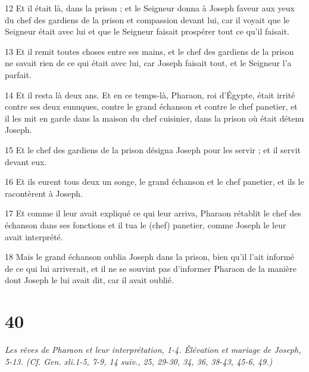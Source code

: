 \par 12 Et il était là, dans la prison ; et le Seigneur donna à Joseph faveur aux yeux du chef des gardiens de la prison et compassion devant lui, car il voyait que le Seigneur était avec lui et que le Seigneur faisait prospérer tout ce qu'il faisait.
\par 13 Et il remit toutes choses entre ses mains, et le chef des gardiens de la prison ne savait rien de ce qui était avec lui, car Joseph faisait tout, et le Seigneur l'a parfait.
\par 14 Et il resta là deux ans. Et en ce temps-là, Pharaon, roi d'Égypte, était irrité contre ses deux eunuques, contre le grand échanson et contre le chef panetier, et il les mit en garde dans la maison du chef cuisinier, dans la prison où était détenu Joseph.
\par 15 Et le chef des gardiens de la prison désigna Joseph pour les servir ; et il servit devant eux.
\par 16 Et ils eurent tous deux un songe, le grand échanson et le chef panetier, et ils le racontèrent à Joseph.
\par 17 Et comme il leur avait expliqué ce qui leur arriva, Pharaon rétablit le chef des échanson dans ses fonctions et il tua le (chef) panetier, comme Joseph le leur avait interprété.
\par 18 Mais le grand échanson oublia Joseph dans la prison, bien qu'il l'ait informé de ce qui lui arriverait, et il ne se souvint pas d'informer Pharaon de la manière dont Joseph le lui avait dit, car il avait oublié.

\chapter{40}

\par \textit{Les rêves de Pharaon et leur interprétation, 1-4. Élévation et mariage de Joseph, 5-13. (Cf. Gen. xli.1-5, 7-9, 14 suiv., 25, 29-30, 34, 36, 38-43, 45-6, 49.)}

